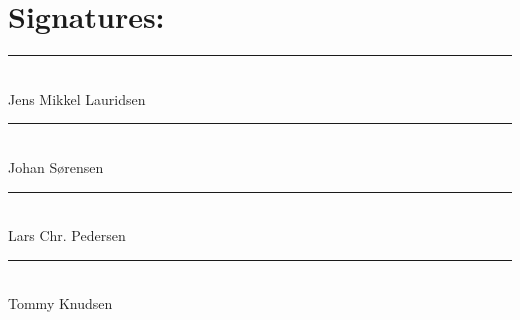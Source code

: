 \chapter*{Signatures:}

\noindent\rule{8cm}{0.03cm}\\
Jens Mikkel Lauridsen\\

\noindent\rule{8cm}{0.03cm}\\
Johan Sørensen\\

\noindent\rule{8cm}{0.03cm}\\ 
Lars Chr. Pedersen\\ 

\noindent\rule{8cm}{0.03cm}\\
Tommy Knudsen\\
